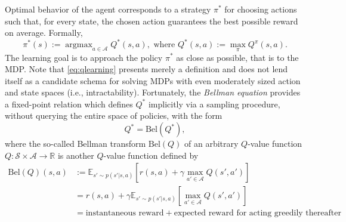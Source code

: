 \documentclass[10pt,letterpaper]{article}
\DeclareMathOperator{\argmax}{argmax}
\begin{document}
Optimal behavior of the agent corresponds to
a strategy $\pi^*$ for choosing actions such that, for every state, the chosen action guarantees the best possible reward on average. Formally,
\begin{equation}
  \pi^*(s) := \argmax_{a \in \mathcal A}{Q}^*(s, a),\text{ where }Q^*(s, a) := \max_{\pi}Q^\pi(s,a).
  \label{eq:qlearning}
\end{equation}
The learning goal is to approach the
policy $\pi^*$ as close as possible, that is to  the MDP.
Note that \eqref{eq:qlearning} presents merely a definition and
does not lend itself as a candidate schema
for solving MDPs with even moderately sized action and state spaces
(i.e., intractability).
Fortunately, the \textit{Bellman equation} \citep{sutton1998reinforcement} provides a fixed-point relation which defines $Q^*$ implicitly via a sampling procedure, without querying the entire space of policies, with the form
\begin{equation}
  Q^* = \text{Bel}(Q^*),
  \label{eq:bellman}
\end{equation}
where the so-called Bellman transform $\text{Bel}(Q)$
of an arbitrary $Q$-value function $Q: \mathcal S \times \mathcal A \rightarrow \mathbb R$  is another $Q$-value function defined by
\begin{equation}
  \begin{split}
   \text{Bel}(Q)(s,a) &:=
   \mathbb E_{s' \sim p(s'|s,a)} [r(s,a) + \gamma \max_{a' \in \mathcal A}Q(s', a')]\\
   &= r(s,a) + \gamma\mathbb E_{s' \sim p(s'|s,a)} [\max_{a' \in \mathcal A}Q(s', a')]\\
   &= \text{instantaneous reward} + \text{expected reward for acting greedily thereafter}
    \end{split}
  \end{equation}
\end{document}
